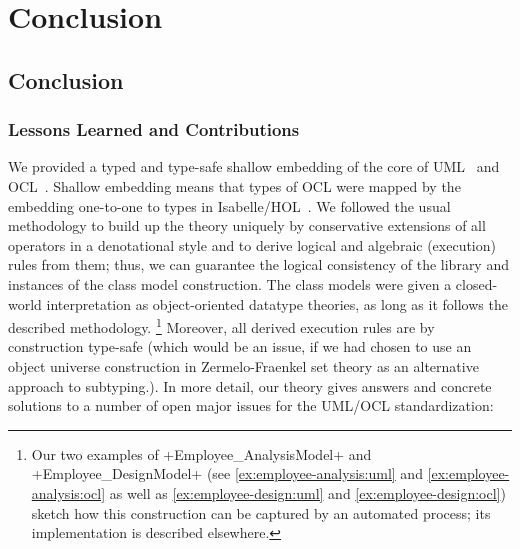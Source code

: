 \part{Conclusion}

\chapter{Conclusion}

\section{Lessons Learned and Contributions}
We provided a typed and type-safe shallow embedding of the core of
UML~\cite{omg:uml-infrastructure:2011,omg:uml-superstructure:2011} and
OCL~\cite{omg:ocl:2012}. Shallow embedding means that types of OCL
were mapped by the embedding one-to-one to types in
Isabelle/HOL~\cite{nipkow.ea:isabelle:2002}.  We followed the usual
methodology to build up the theory uniquely by conservative extensions
of all operators in a denotational style and to derive logical and
algebraic (execution) rules from them; thus, we can guarantee the
logical consistency of the library and instances of the class model
construction. The class models were given a closed-world interpretation 
as object-oriented datatype theories, as
long as it follows the described methodology.%
\isatagafp
\footnote{Our two
  examples of \inlineisar+Employee_AnalysisModel+ and
  \inlineisar+Employee_DesignModel+ (see
  \autoref{ex:employee-analysis:uml} and
  \autoref{ex:employee-analysis:ocl} as well as
  \autoref{ex:employee-design:uml} and
  \autoref{ex:employee-design:ocl}) sketch how this construction can
  be captured by an automated process; its implementation is described 
  elsewhere.}
\endisatagafp
Moreover, all derived
execution rules are by construction type-safe (which would be an
issue, if we had chosen to use an object universe construction in
Zermelo-Fraenkel set theory as an alternative approach to subtyping.).
In more detail, our theory gives answers and concrete solutions to a
number of open major issues for the UML/OCL standardization:
